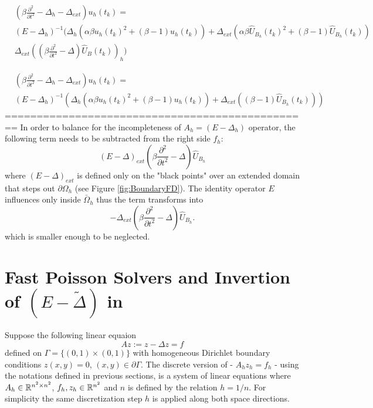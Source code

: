\documentclass[11pt,a4paper,twoside]{article}
\begin{document}
\begin{align}
&(\beta \frac{ \partial^2 } { \partial t^2 } - \Delta_h - \Delta_{ext}) u_h(t_k)  = 
\\
&(E-\Delta_h)^{-1} ( \Delta_h ( \alpha \beta u_h(t_k)^2  + (\beta -1)u_h(t_k)) +  \Delta_{ext} ( \alpha \beta\widehat U_{B_h}(t_k)^2  + (\beta -1)\widehat U_{B_h}(t_k))   \nonumber
\\
&\Delta_{ext}((\beta \frac{ \partial^2 } { \partial t^2 } - \Delta)\widehat U_B(t_k))_h )
\end{align}

\begin{align}
&(\beta \frac{ \partial^2 } { \partial t^2 } - \Delta_h - \Delta_{ext}) u_h(t_k)  = 
\\
&(E-\Delta_h)^{-1} ( \Delta_h ( \alpha \beta u_h(t_k)^2  + (\beta -1)u_h(t_k)) +  \Delta_{ext} ( (\beta -1)\widehat U_{B_h}(t_k))  )
\end{align}
================================================
In order to balance for the incompleteness of $A_h = (E-\Delta_h)$ operator, the following term needs to be subtracted from the right side $f_h$:
\begin{equation*}
(E-\Delta)_{ext}(\beta \frac{ \partial^2 } { \partial t^2 } - \Delta) \widehat U_{B_h}
\end{equation*}
where $(E-\Delta)_{ext}$ is defined only on the "black points" over an extended domain that steps out $\partial \Omega_h$ (see Figure \ref{fig:BoundaryFD}). The identity operator $E$ influences only inside $\bar \Omega_h$ thus the term transforms into
\begin{equation*}
-\Delta_{ext}(\beta \frac{ \partial^2 } { \partial t^2 } - \Delta) \widehat U_{B_h}.
\end{equation*}
which is smaller enough to be neglected.

\section{Fast Poisson Solvers and Invertion of $(E-\tilde \Delta)$ in }\label{FPSsection}
Suppose the following linear equaion
\begin{equation}\label{FPeq}
Az:=z-\Delta z = f
\end{equation}
defined on $\Gamma = \{ (0,1) \times (0,1) \}$ with homogeneous Dirichlet boundary conditions $z(x,y) = 0$, $(x,y) \in \partial \Gamma$. The discrete version of  - $A_h z_h = f_h$ - using the notations defined in previous sections, is a system of linear equations where $A_h \in \mathbb{R}^{n^2 \times n^2}$, $f_h, z_h \in \mathbb{R}^{n^2}$ and $n$ is defined by the relation $h=1/n$. For simplicity the same discretization step $h$ is applied along both space directions.
\end{document}
